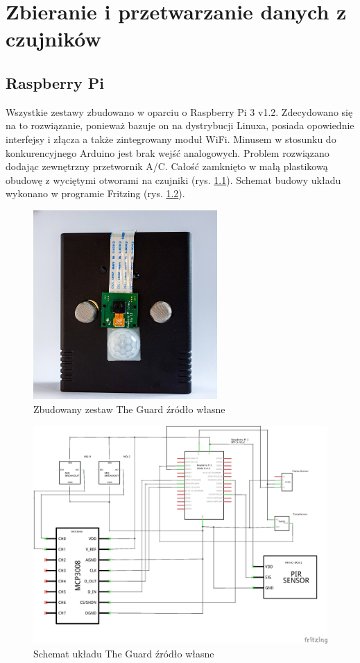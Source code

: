 \chapter{Zbieranie i przetwarzanie danych z czujników}
\section{Raspberry Pi}
Wszystkie zestawy zbudowano w oparciu o Raspberry Pi 3 v1.2. Zdecydowano się na to rozwiązanie, ponieważ bazuje on na dystrybucji Linuxa, posiada opowiednie interfejsy i złącza a także zintegrowany moduł WiFi. Minusem w stosunku do konkurencyjnego Arduino jest brak wejść analogowych. Problem rozwiązano dodając zewnętrzny przetwornik A/C. Całość zamknięto w małą plastikową obudowę z wyciętymi otworami na czujniki (rys. \ref{the_guard_set}). Schemat budowy układu wykonano w programie Fritzing (rys. \ref{the_guard_schem}).
\begin{figure}[h]
	\centering
	\includegraphics[width=7cm]{guard.jpg}
	\caption{Zbudowany zestaw The Guard \newline źródło własne}
	\label{the_guard_set}
\end{figure}
\begin{figure}[h]
	\centering
	\includegraphics[width=15cm]{GuardSchem}
	\caption{Schemat układu The Guard \newline źródło własne}
	\label{the_guard_schem}
\end{figure}
